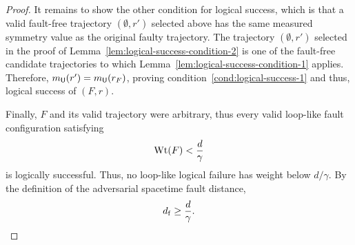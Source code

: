 \documentclass[11pt]{article}
\begin{document}
\begin{proof}
    It remains to show the other condition for logical success, which is that a valid fault-free trajectory $(\emptyset, r')$ selected above has the same measured symmetry value as the original faulty trajectory.
    The trajectory $(\emptyset, r')$ selected in the proof of Lemma~\ref{lem:logical-success-condition-2} is one of the fault-free candidate trajectories to which Lemma~\ref{lem:logical-success-condition-1} applies.
    Therefore, $m_{\mathsf{U}}(r') = m_{\mathsf{U}}(r_F) $,
    proving condition~\ref{cond:logical-success-1} and thus, logical success of $(F,r)$.

    Finally, $F$ and its valid trajectory were arbitrary, thus every valid loop-like fault configuration satisfying
    \[
    \operatorname{Wt}(F) <\frac{d}{\gamma}
    \]
    is logically successful. Thus, no loop-like logical failure has weight below $d/\gamma$.
    By the definition of the adversarial spacetime fault distance,
    \[
    d_{\rm{f}}\ge \frac{d}{\gamma}.
    \]
\end{proof}



\ifdefined\ismainfile
\else
    
\end{document}
